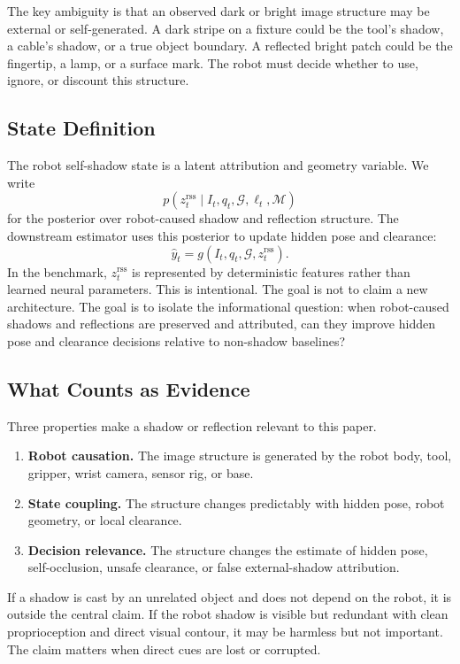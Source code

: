 \documentclass{article}
\newcommand{\rss}{z^{\mathrm{rss}}}
\newcommand{\illum}{\ell}
\newcommand{\geom}{\mathcal{G}}
\newcommand{\image}{I}
\begin{document}
The key ambiguity is that an observed dark or bright image structure may be external or self-generated. A dark stripe on a fixture could be the tool's shadow, a cable's shadow, or a true object boundary. A reflected bright patch could be the fingertip, a lamp, or a surface mark. The robot must decide whether to use, ignore, or discount this structure.

\subsection{State Definition}

The robot self-shadow state is a latent attribution and geometry variable. We write
\[
p(\rss_t \mid \image_t, q_t, \geom, \illum_t, \mathcal{M})
\]
for the posterior over robot-caused shadow and reflection structure. The downstream estimator uses this posterior to update hidden pose and clearance:
\[
\hat{y}_t = g(\image_t, q_t, \geom, \rss_t).
\]
In the benchmark, $\rss_t$ is represented by deterministic features rather than learned neural parameters. This is intentional. The goal is not to claim a new architecture. The goal is to isolate the informational question: when robot-caused shadows and reflections are preserved and attributed, can they improve hidden pose and clearance decisions relative to non-shadow baselines?

\subsection{What Counts as Evidence}

Three properties make a shadow or reflection relevant to this paper.
\begin{enumerate}[leftmargin=1.5em]
\item \textbf{Robot causation.} The image structure is generated by the robot body, tool, gripper, wrist camera, sensor rig, or base.
\item \textbf{State coupling.} The structure changes predictably with hidden pose, robot geometry, or local clearance.
\item \textbf{Decision relevance.} The structure changes the estimate of hidden pose, self-occlusion, unsafe clearance, or false external-shadow attribution.
\end{enumerate}

If a shadow is cast by an unrelated object and does not depend on the robot, it is outside the central claim. If the robot shadow is visible but redundant with clean proprioception and direct visual contour, it may be harmless but not important. The claim matters when direct cues are lost or corrupted.
\end{document}
